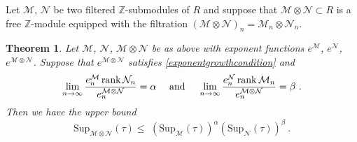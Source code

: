 \documentclass[a4paper,10pt]{amsart}
\newtheorem{thm}{Theorem}[section]
\theoremstyle{definition}
\theoremstyle{remark}
\numberwithin{equation}{section}
\newcommand{\Z}{\mathbb Z}
\newcommand{\ts}{\mathrm{Sup}}
\newcommand{\rank}{\mathrm{rank}}
\newcommand{\0}{\color{blue}{\mathsf{0}}}
\begin{document}
  Let $\mathcal{M}$, $\mathcal{N}$ be two filtered   $\Z$-submodules of $R$ and suppose that $\mathcal{M} \otimes \mathcal{N} \subset R$ is a free $\Z$-module equipped with the filtration $(\mathcal{M} \otimes \mathcal{N} )_n =  \mathcal{M}_n \otimes \mathcal{N}_n$.
  
    
    
    
  
  
  \begin{thm}  \label{thm: tsuptensorproductUB}  Let $\mathcal{M}$, $\mathcal{N}$, $\mathcal{M} \otimes\mathcal{N}$   be as above with exponent functions  $e^\mathcal{M}$, $e^\mathcal{N}$, $e^{\mathcal{M}\otimes\mathcal{N}}$. Suppose that  $e^{\mathcal{M}\otimes \mathcal{N}}$ satisfies \eqref{exponentgrowthcondition} and 
      \[   \lim_{n \rightarrow \infty}  \frac{e^{\mathcal{M}}_n \, \rank\, \mathcal{N}_n}{ e^{\mathcal{M}\otimes\mathcal{N}}_n}  =\alpha \quad \hbox{ and } \quad    \lim_{n \rightarrow \infty}  \frac{e^{\mathcal{N}}_n \, \rank\, \mathcal{M}_n}{ e^{\mathcal{M}\otimes\mathcal{N}}_n}= \beta \ .   \]
   Then we have the upper bound
    \begin{equation} 
     \label{eqn: tsuptensorproductUB} 
      \ts_{\mathcal{M} \otimes \mathcal{N}} (\tau )  \leq     \, \,   \left(\ts_{\mathcal{M}}(\tau) \right)^{\alpha}   \left(\ts_{\mathcal{N}}(\tau) \right)^{\beta}     \  .  
  \end{equation}
      \end{thm} 
    
\end{document}
